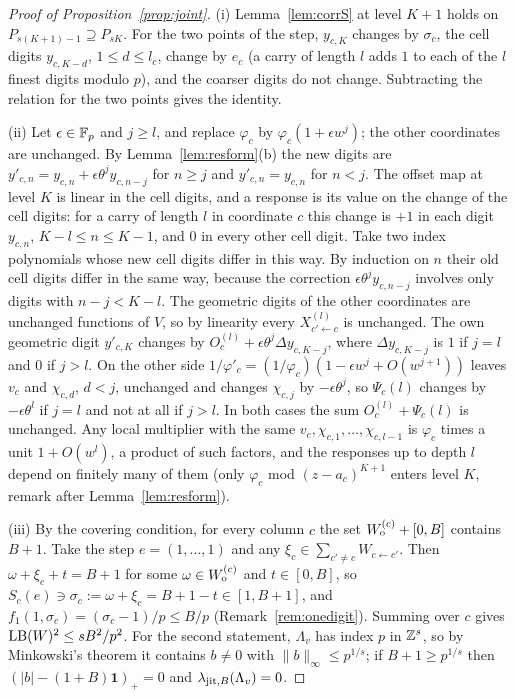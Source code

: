 \begin{proof}[Proof of Proposition~\ref{prop:joint}]
(i) Lemma~\ref{lem:corrS} at level $K+1$ holds on $P_{s(K+1)-1}\supseteq P_{sK}$. For the two points of the step, $y_{c,K}$ changes by $\sigma_c$, the cell digits $y_{c,K-d}$, $1\le d\le l_c$, change by $e_c$ (a carry of length $l$ adds $1$ to each of the $l$ finest digits modulo $p$), and the coarser digits do not change. Subtracting the relation for the two points gives the identity.

(ii) Let $\epsilon\in\mathbb{F}_p$ and $j\ge l$, and replace $\varphi_c$ by $\varphi_c(1+\epsilon w^j)$; the other coordinates are unchanged. By Lemma~\ref{lem:resform}(b) the new digits are $y'_{c,n}=y_{c,n}+\epsilon\theta^jy_{c,n-j}$ for $n\ge j$ and $y'_{c,n}=y_{c,n}$ for $n<j$. The offset map at level $K$ is linear in the cell digits, and a response is its value on the change of the cell digits: for a carry of length $l$ in coordinate $c$ this change is $+1$ in each digit $y_{c,n}$, $K-l\le n\le K-1$, and $0$ in every other cell digit. Take two index polynomials whose new cell digits differ in this way. By induction on $n$ their old cell digits differ in the same way, because the correction $\epsilon\theta^jy_{c,n-j}$ involves only digits with $n-j<K-l$. The geometric digits of the other coordinates are unchanged functions of $V$, so by linearity every $X^{(l)}_{c'\leftarrow c}$ is unchanged. The own geometric digit $y'_{c,K}$ changes by $O_c^{(l)}+\epsilon\theta^j\Delta y_{c,K-j}$, where $\Delta y_{c,K-j}$ is $1$ if $j=l$ and $0$ if $j>l$. On the other side $1/\varphi'_c=(1/\varphi_c)(1-\epsilon w^j+O(w^{j+1}))$ leaves $v_c$ and $\chi_{c,d}$, $d<j$, unchanged and changes $\chi_{c,j}$ by $-\epsilon\theta^j$, so $\Psi_c(l)$ changes by $-\epsilon\theta^l$ if $j=l$ and not at all if $j>l$. In both cases the sum $O_c^{(l)}+\Psi_c(l)$ is unchanged. Any local multiplier with the same $v_c,\chi_{c,1},\dots,\chi_{c,l-1}$ is $\varphi_c$ times a unit $1+O(w^l)$, a product of such factors, and the responses up to depth $l$ depend on finitely many of them (only $\varphi_c$ mod $(z-a_c)^{K+1}$ enters level $K$, remark after Lemma~\ref{lem:resform}).

(iii) By the covering condition, for every column $c$ the set $W_{\mathrm o}^{(c)}+[0,B]$ contains $B+1$. Take the step $e=(1,\dots,1)$ and any $\xi_c\in\sum_{c'\ne c}W_{c\leftarrow c'}$. Then $\omega+\xi_c+t=B+1$ for some $\omega\in W_{\mathrm o}^{(c)}$ and $t\in[0,B]$, so $S_c(e)\ni\sigma_c:=\omega+\xi_c=B+1-t\in[1,B+1]$, and $f_1(1,\sigma_c)=(\sigma_c-1)/p\le B/p$ (Remark~\ref{rem:onedigit}). Summing over $c$ gives $\mathrm{LB}(W)^2\le sB^2/p^2$. For the second statement, $\Lambda_v$ has index $p$ in $\mathbb{Z}^s$, so by Minkowski's theorem it contains $b\ne0$ with $\|b\|_\infty\le p^{1/s}$; if $B+1\ge p^{1/s}$ then $(|b|-(1+B)\mathbf 1)_+=0$ and $\lambda_{\mathrm{jit},B}(\Lambda_v)=0$.
\end{proof}

